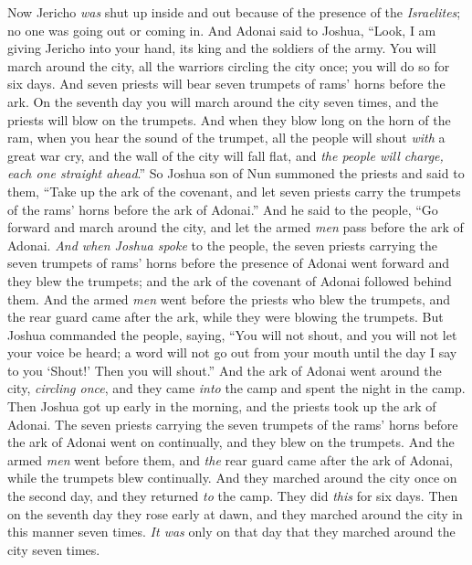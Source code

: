 \begin{biblechapter} %
 Now Jericho \textit{was} shut up inside and out because of the presence of the \textit{Israelites}; no one was going out or coming in.
\verse And Adonai said to Joshua, “Look, I am giving Jericho into your hand, its king and the soldiers of the army.
\verse You will march around the city, all the warriors circling the city once; you will do so for six days.
\verse And seven priests will bear seven trumpets of rams’ horns before the ark. On the seventh day you will march around the city seven times, and the priests will blow on the trumpets.
\verse And when they blow long on the horn of the ram, when you hear the sound of the trumpet, all the people will shout \textit{with} a great war cry, and the wall of the city will fall flat, and \textit{the people will charge, each one straight ahead}.”
\verse So Joshua son of Nun summoned the priests and said to them, “Take up the ark of the covenant, and let seven priests carry the trumpets of the rams’ horns before the ark of Adonai.”
\verse And he said to the people, “Go forward and march around the city, and let the armed \textit{men} pass before the ark of Adonai.
\verse \textit{And when Joshua spoke} to the people, the seven priests carrying the seven trumpets of rams’ horns before the presence of Adonai went forward and they blew the trumpets; and the ark of the covenant of Adonai followed behind them.
\verse And the armed \textit{men} went before the priests who blew the trumpets, and the rear guard came after the ark, while they were blowing the trumpets.
\verse But Joshua commanded the people, saying, “You will not shout, and you will not let your voice be heard; a word will not go out from your mouth until the day I say to you ‘Shout!’ Then you will shout.”
\verse And the ark of Adonai went around the city, \textit{circling once}, and they came \textit{into} the camp and spent the night in the camp.
\verse Then Joshua got up early in the morning, and the priests took up the ark of Adonai.
\verse The seven priests carrying the seven trumpets of the rams’ horns before the ark of Adonai went on continually, and they blew on the trumpets. And the armed \textit{men} went before them, and \textit{the} rear guard came after the ark of Adonai, while the trumpets blew continually.
\verse And they marched around the city once on the second day, and they returned \textit{to} the camp. They did \textit{this} for six days.
\verse Then on the seventh day they rose early at dawn, and they marched around the city in this manner seven times. \textit{It was} only on that day that they marched around the city seven times.

\end{biblechapter}

